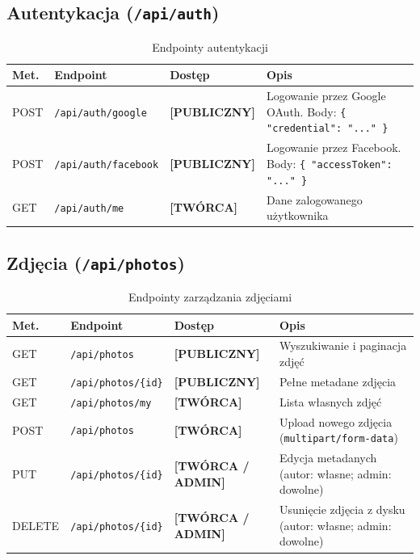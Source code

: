 \documentclass[12pt, a4paper]{article}
\begin{document}
\subsection{Autentykacja (\texttt{/api/auth})}

\begin{table}[H]
  \centering
  \caption{Endpointy autentykacji}
  \begin{tabular}{@{}L{1.5cm}L{4cm}L{2.5cm}L{6cm}@{}}
    \toprule
    \textbf{Met.} & \textbf{Endpoint} & \textbf{Dostęp} & \textbf{Opis} \\
    \midrule
    POST & \texttt{/api/auth/google}   & \textbf{[PUBLICZNY]} & Logowanie przez Google OAuth. Body: \texttt{\{ "credential": "..." \}} \\
    POST & \texttt{/api/auth/facebook} & \textbf{[PUBLICZNY]} & Logowanie przez Facebook. Body: \texttt{\{ "accessToken": "..." \}} \\
    GET  & \texttt{/api/auth/me}       & \textbf{[TWÓRCA]}    & Dane zalogowanego użytkownika \\
    \bottomrule
  \end{tabular}
\end{table}

\subsection{Zdjęcia (\texttt{/api/photos})}

\begin{table}[H]
  \centering
  \caption{Endpointy zarządzania zdjęciami}
  \begin{tabular}{@{}L{1.5cm}L{4.5cm}L{2.5cm}L{5.5cm}@{}}
    \toprule
    \textbf{Met.} & \textbf{Endpoint} & \textbf{Dostęp} & \textbf{Opis} \\
    \midrule
    GET    & \texttt{/api/photos}        & \textbf{[PUBLICZNY]}         & Wyszukiwanie i paginacja zdjęć \\
    GET    & \texttt{/api/photos/\{id\}} & \textbf{[PUBLICZNY]}         & Pełne metadane zdjęcia \\
    GET    & \texttt{/api/photos/my}     & \textbf{[TWÓRCA]}            & Lista własnych zdjęć \\
    POST   & \texttt{/api/photos}        & \textbf{[TWÓRCA]}            & Upload nowego zdjęcia (\texttt{multipart/form-data}) \\
    PUT    & \texttt{/api/photos/\{id\}} & \textbf{[TWÓRCA / ADMIN]}    & Edycja metadanych (autor: własne; admin: dowolne) \\
    DELETE & \texttt{/api/photos/\{id\}} & \textbf{[TWÓRCA / ADMIN]}    & Usunięcie zdjęcia z dysku (autor: własne; admin: dowolne) \\
    \bottomrule
  \end{tabular}
\end{table}
\end{document}
